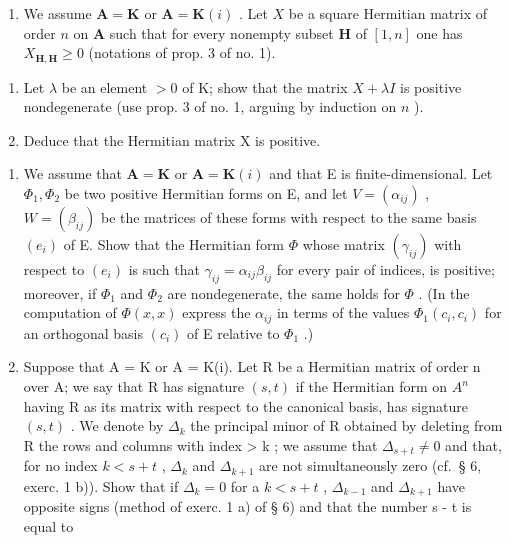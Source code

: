 \begin{enumerate}
\def\labelenumi{\arabic{enumi})}
\setcounter{enumi}{1}
\tightlist
\item
  We assume \(\mathbf{A} = \mathbf{K}\) or \(\mathbf{A} = \mathbf{K}(i)\) . Let \(X\) be a square Hermitian matrix of order \(n\) on \(\mathbf{A}\) such that for every nonempty subset \(\mathbf{H}\) of \([1, n]\) one has \(X_{\mathbf{H},\mathbf{H}} \geqslant 0\) (notations of prop. 3 of no. 1).
\end{enumerate}

\begin{enumerate}
\def\labelenumi{\alph{enumi})}
\item
  Let \(\lambda\) be an element \(>0\) of K; show that the matrix \(X + \lambda I\) is positive nondegenerate (use prop. 3 of no. 1, arguing by induction on \(n\) ).
\item
  Deduce that the Hermitian matrix X is positive.
\end{enumerate}

\begin{enumerate}
\def\labelenumi{\arabic{enumi})}
\setcounter{enumi}{2}
\item
  We assume that \(\mathbf{A} = \mathbf{K}\) or \(\mathbf{A} = \mathbf{K}(i)\) and that E is finite-dimensional. Let \(\Phi_1, \Phi_2\) be two positive Hermitian forms on E, and let \(V = (\alpha_{ij})\) , \(W = (\beta_{ij})\) be the matrices of these forms with respect to the same basis \((e_i)\) of E. Show that the Hermitian form \(\Phi\) whose matrix \((\gamma_{ij})\) with respect to \((e_i)\) is such that \(\gamma_{ij} = \alpha_{ij}\beta_{ij}\) for every pair of indices, is positive; moreover, if \(\Phi_1\) and \(\Phi_2\) are nondegenerate, the same holds for \(\Phi\) . (In the computation of \(\Phi(x, x)\) express the \(\alpha_{ij}\) in terms of the values \(\Phi_1(c_i, c_i)\) for an orthogonal basis \((c_i)\) of E relative to \(\Phi_1\) .)
\item
  Suppose that A = K or A = K(i). Let R be a Hermitian matrix of order n over A; we say that R has signature \((s, t)\) if the Hermitian form on \(A^{n}\) having R as its matrix with respect to the canonical basis, has signature \((s, t)\) . We denote by \(\Delta_{k}\) the principal minor of R obtained by deleting from R the rows and columns with index \textgreater{} k ; we assume that \(\Delta_{s+t} \neq 0\) and that, for no index \(k < s + t\) , \(\Delta_{k}\) and \(\Delta_{k+1}\) are not simultaneously zero (cf.~§ 6, exerc. 1 b)). Show that if \(\Delta_{k} = 0\) for a \(k < s + t\) , \(\Delta_{k-1}\) and \(\Delta_{k+1}\) have opposite signs (method of exerc. 1 a) of § 6) and that the number s - t is equal to
\end{enumerate}

